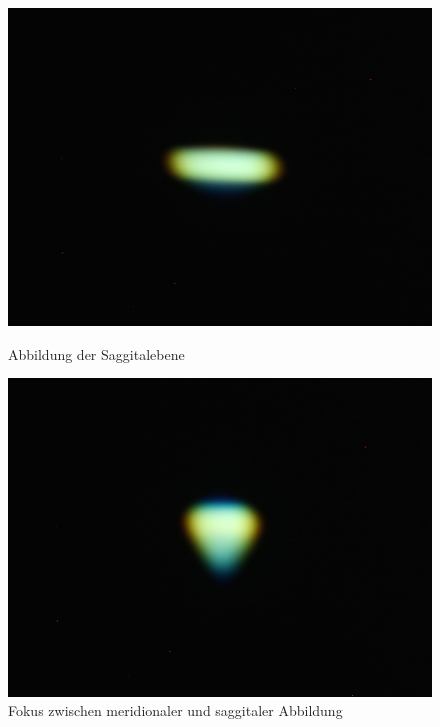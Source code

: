 \begin{figure}[htb]
	\begin{minipage}[t]{0.48\textwidth}
		\includegraphics[width=\linewidth]{img/Astigmatismus/Prakt_Linsenfehler_2015_06_04_087_saggital}
		\caption{Abbildung der Saggitalebene}
		\label{fig:astigmatismus_saggital}
	\end{minipage}
	\hfill
	\begin{minipage}[t]{0.48\textwidth}
		\includegraphics[width=\linewidth]{img/Astigmatismus/Prakt_Linsenfehler_2015_06_04_089_mittenfokus}
		\caption{Fokus zwischen meridionaler und saggitaler Abbildung}
		\label{fig:astigmatismus_mittenfokus}
	\end{minipage}
\end{figure}

